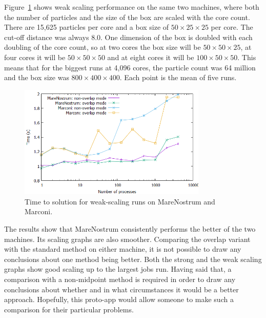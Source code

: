 \documentclass[paper=a4, fontsize=11pt,bibtotoc]{scrartcl}		%
\begin{document}
Figure~\ref{FIG_weak} shows weak scaling performance on the same two machines, where both the number of particles and the size of the box are scaled with the core count. There are 15,625 particles per core and a box size of $50\times 25 \times 25$ per core. The cut-off distance was always 8.0. One dimension of the box is doubled with each doubling of the core count, so at two cores the box size will be $50\times 50 \times 25$, at four cores it will be $50\times 50 \times 50$ and at eight cores it will be $100\times 50 \times 50$. This means that for the biggest runs at 4,096 cores, the particle count was 64 million and the box size was $800\times 400 \times 400$. Each point is the mean of five runs.
\begin{figure}
	\centering
	\includegraphics[width=0.8\textwidth]{FIGS/exaMD_weak_scaling_plot.png}
	\caption{Time to solution for weak-scaling runs on MareNostrum and Marconi.}
	\label{FIG_weak}
\end{figure}

The results show that MareNostrum consistently performs the better of the two machines. Its scaling graphs are also smoother. Comparing the overlap variant with the standard method on either machine, it is not possible to draw any conclusions about one method being better. Both the strong and the weak scaling graphs show good scaling up to the largest jobs run. Having said that, a comparison with a non-midpoint method is required in order to draw any conclusions about whether and in what circumstances it would be a better approach. Hopefully, this proto-app would allow someone to make such a comparison for their particular problems. 

\end{document}
